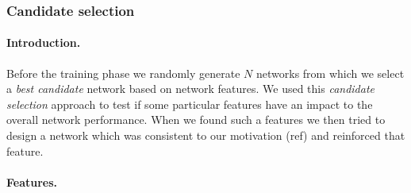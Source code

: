 
\subsubsection{Candidate selection} 

\paragraph{Introduction.} 
Before the training phase we randomly generate $N$ networks from which we select a \emph{best candidate} network based on network features. We used this \emph{candidate selection} approach to test if some particular features have an impact to the overall network performance. When we found such a features we then tried to design a network which was consistent to our motivation (ref) and reinforced that feature. 

\paragraph{Features.}

